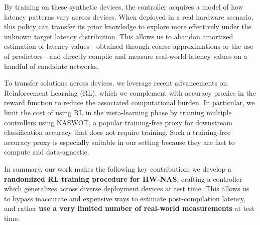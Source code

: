 By training on these synthetic devices, the controller acquires a model of how latency patterns vary across devices. When deployed in a real hardware scenario, this policy can transfer its prior knowledge to explore more effectively under the unknown target latency distribution. This allows us to abandon amortized estimation of latency values---obtained through coarse approximations or the use of predictors---and directly compile and measure real-world latency values on a handful of candidate networks.

To transfer solutions across devices, we leverage recent advancements on Reinforcement Learning (RL), which we complement with accuracy proxies in the reward function to reduce the associated computational burden. In particular, we limit the cost of using RL in the meta-learning phase by training multiple controllers using NASWOT, a popular training-free proxy for downstream classification accuracy that does not require training. Such a training-free accuracy proxy is especially suitable in our setting because they are fast to compute and data-agnostic.

In summary, our work makes the following key contribution: we develop a \textbf{randomized RL training procedure for HW-NAS}, crafting a controller which generalizes across diverse deployment devices at test time. This allows us to bypass inaccurate and expensive ways to estimate post-compilation latency, and rather \textbf{use a very limited number of real-world measurements} at test time.
